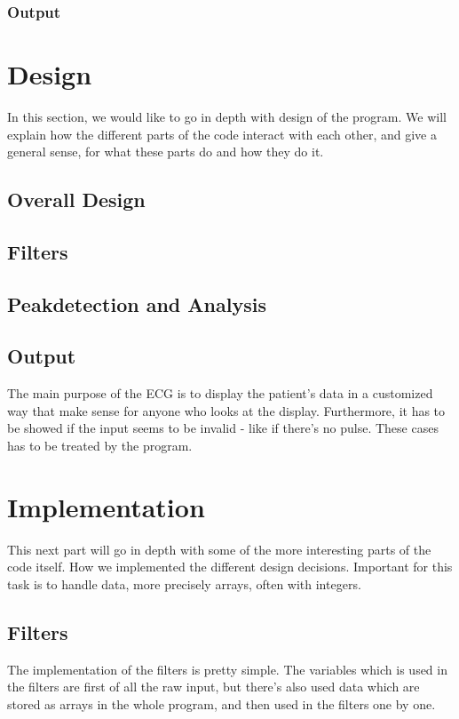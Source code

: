 \documentclass[12pt, danish, a4paper, titlepage]{article}
\begin{document}
			\subsubsection{Output}
			
	\section{Design}
	In this section, we would like to go in depth with design of the program. We will explain how the different parts of the code interact with each other, and give a general sense, for what these parts do and how they do it.
		\subsection{Overall Design}
		\subsection{Filters}
		\subsection{Peakdetection and Analysis}
		\subsection{Output}
			The main purpose of the ECG is to display the patient's data in a customized way that make sense for anyone who looks at the display. Furthermore, it has to be showed if the input seems to be invalid - like if there's no pulse. These cases has to be treated by the program.
		
	\section{Implementation}
	This next part will go in depth with some of the more interesting parts of the code itself. How we implemented the different design decisions. Important for this task is to handle data, more precisely arrays, often with integers. 
	
		\subsection{Filters}
			The implementation of the filters is pretty simple. The variables which is used in the filters are first of all the raw input, but there's also used data which are stored as arrays in the whole program, and then used in the filters one by one. 
			
\end{document}
